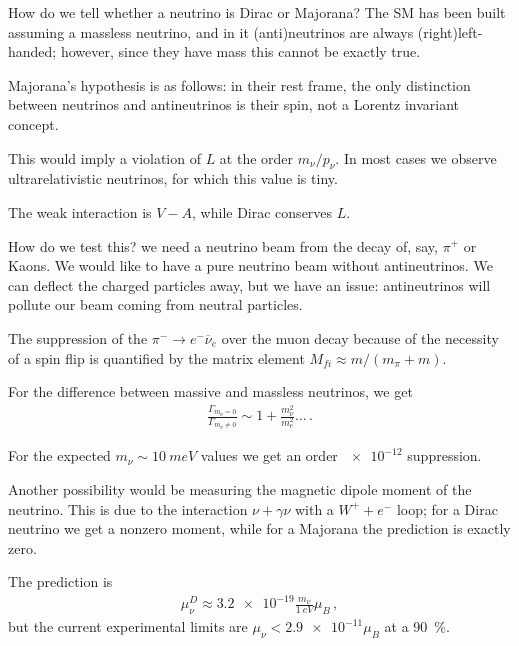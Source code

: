 \documentclass[main.tex]{subfiles}
\begin{document}

How do we tell whether a neutrino is Dirac or Majorana? 
The SM has been built assuming a massless neutrino, 
and in it (anti)neutrinos are always (right)left-handed; 
however, since they have mass this cannot be exactly true. 

Majorana's hypothesis is as follows:
in their rest frame, the only distinction between neutrinos and antineutrinos
is their spin, not a Lorentz invariant concept.

This would imply a violation of \(L\) at the order \(m_\nu / p_\nu \). 
In most cases we observe ultrarelativistic neutrinos, for which this value is tiny. 

The weak interaction is \(V-A\), while Dirac conserves \(L\). 

How do we test this? we need a neutrino beam from the decay of, say, \(\pi^{+}\) or Kaons. 
We would like to have a pure neutrino beam without antineutrinos. 
We can deflect the charged particles away, but we have an issue: antineutrinos
will pollute our beam coming from neutral particles. 

The suppression of the \(\pi^{-} \to e^{-} \overline{\nu}_e\) over the muon decay
because of the necessity of a spin flip
is quantified by the matrix element \(M_{fi} \approx m / (m_\pi + m)\). 

For the difference between massive and massless neutrinos, we get 
%
\begin{align}
\frac{\Gamma_{m_\nu = 0}}{\Gamma_{m_\nu \neq 0}} \sim 1 + \frac{m_\nu ^2}{m_e^2} \dots
\,.
\end{align}

For the expected \(m_\nu \sim \SI{10}{meV}\) values we get an order \(\num{e-12}\) suppression. 

Another possibility would be measuring the magnetic dipole moment of the neutrino. 
This is due to the interaction \(\nu + \gamma \nu \) with a \(W^{+} + e^{-}\) loop; 
for a Dirac neutrino we get a nonzero moment, while for a Majorana the prediction 
is exactly zero. 


The prediction is 
%
\begin{align}
\mu^{D}_\nu 
\approx \num{3.2e-19} \frac{m_\nu}{\SI{1}{eV}} \mu _B
\,,
\end{align}
%
but the current experimental limits are \(\mu _\nu < \num{2.9e-11} \mu _B\) at a \SI{90}{\percent}. 

\end{document}
